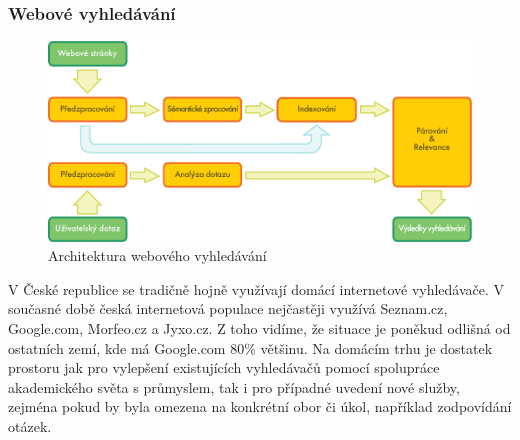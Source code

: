\begin{multicols}{2}
\subsubsection{Webové vyhledávání}
\begin{figure}[htb]
  \center
  \includegraphics[width=\textwidth]{../_media/czech/web_search_architecture}
  \caption{Architektura webového vyhledávání}
  \label{fig:websearcharch_en}
 \end{figure}
V České republice se tradičně hojně využívají domácí internetové vyhledávače. V současné době česká internetová populace nejčastěji využívá Seznam.cz, Google.com, Morfeo.cz a Jyxo.cz. Z toho vidíme, že situace je poněkud odlišná od ostatních zemí, kde má Google.com 80\% většinu. Na domácím trhu je dostatek prostoru jak pro vylepšení existujících vyhledávačů pomocí spolupráce akademického světa s průmyslem, tak i pro případné uvedení nové služby, zejména pokud by byla omezena na konkrétní obor či úkol, například zodpovídání otázek.


\end{multicols}
